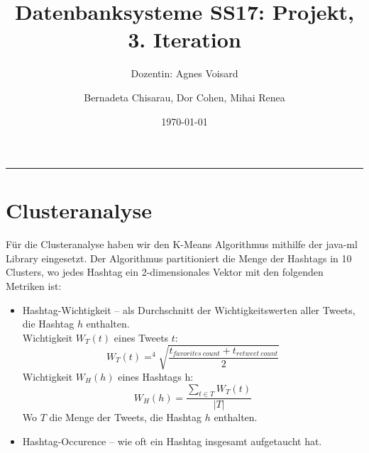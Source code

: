 \documentclass[paper=a4, english, ngerman, romanian]{scrartcl}
\begin{document}
\begin{titlepage}
	\title{Datenbanksysteme SS17: Projekt, 3. Iteration}	
	\subtitle{Dozentin: Agnes Voisard}
	\author{Bernadeta Chisarau, Dor Cohen, Mihai Renea}
	\date{\normalsize \today}
\end{titlepage}

\maketitle								%
\vspace*{-8cm}							%

\vspace{7cm}							%
\rule{\linewidth}{0.8pt}				%
	\section{Clusteranalyse}
		Für die Clusteranalyse haben wir den K-Means Algorithmus mithilfe der java-ml Library eingesetzt. Der Algorithmus partitioniert die Menge der Hashtags in 10 Clusters, wo jedes Hashtag ein 2-dimensionales Vektor mit den folgenden Metriken ist:
		\begin{itemize}
			\item Hashtag-Wichtigkeit -- als Durchschnitt der Wichtigkeitswerten aller Tweets, die Hashtag $h$ enthalten.\\
			Wichtigkeit $W_T(t)$ eines Tweets $t$:\\
			\begin{equation*}
				W_T(t) = ^4\sqrt{\frac{t_{favorites\ count} + t_{retweet\ count}}{2}}
			\end{equation*}
			Wichtigkeit $W_H(h)$ eines Hashtags h:
			\begin{equation*}
				W_H(h) = \frac{\sum_{t \in T} W_T(t)}{|T|}
			\end{equation*}
			Wo $T$ die Menge der Tweets, die Hashtag $h$ enthalten.
			
			\item Hashtag-Occurence -- wie oft ein Hashtag insgesamt aufgetaucht hat.
		\end{itemize}
		
\end{document}
